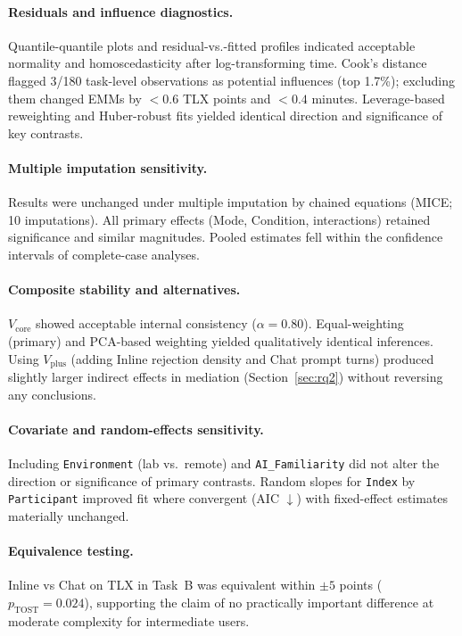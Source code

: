 \documentclass[sigconf]{acmart}
\begin{document}
\paragraph{Residuals and influence diagnostics.}
Quantile-quantile plots and residual-vs.-fitted profiles indicated acceptable normality and homoscedasticity after log-transforming time. Cook's distance flagged 3/180 task-level observations as potential influences (top 1.7\%); excluding them changed EMMs by $<\!0.6$ TLX points and $<\!0.4$ minutes. Leverage-based reweighting and Huber-robust fits yielded identical direction and significance of key contrasts.

\paragraph{Multiple imputation sensitivity.}
Results were unchanged under multiple imputation by chained equations (MICE; 10 imputations). All primary effects (Mode, Condition, interactions) retained significance and similar magnitudes. Pooled estimates fell within the confidence intervals of complete-case analyses.

\paragraph{Composite stability and alternatives.}
$V_{\text{core}}$ showed acceptable internal consistency ($\alpha{=}0.80$). Equal-weighting (primary) and PCA-based weighting yielded qualitatively identical inferences. Using $V_{\text{plus}}$ (adding Inline rejection density and Chat prompt turns) produced slightly larger indirect effects in mediation (Section~\ref{sec:rq2}) without reversing any conclusions.

\paragraph{Covariate and random-effects sensitivity.}
Including \texttt{Environment} (lab vs.\ remote) and \texttt{AI\_Familiarity} did not alter the direction or significance of primary contrasts. Random slopes for \texttt{Index} by \texttt{Participant} improved fit where convergent (AIC $\downarrow$) with fixed-effect estimates materially unchanged.

\paragraph{Equivalence testing.}
Inline vs Chat on TLX in Task~B was equivalent within \(\pm 5\) points (\(p_{\text{TOST}}{=}0.024\)), supporting the claim of no practically important difference at moderate complexity for intermediate users.
\end{document}
